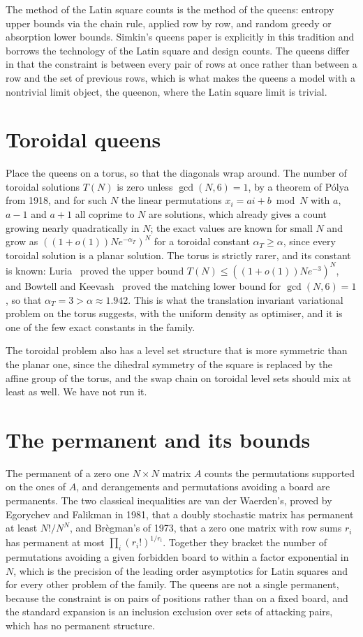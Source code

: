 The method of the Latin square counts is the method of the queens: entropy upper bounds via the chain rule, applied row by row, and random greedy or absorption lower bounds. Simkin's queens paper is explicitly in this tradition and borrows the technology of the Latin square and design counts. The queens differ in that the constraint is between every pair of rows at once rather than between a row and the set of previous rows, which is what makes the queens a model with a nontrivial limit object, the queenon, where the Latin square limit is trivial.

\section{Toroidal queens}

Place the queens on a torus, so that the diagonals wrap around. The number of toroidal solutions $T(N)$ is zero unless $\gcd(N, 6) = 1$, by a theorem of P\'olya from 1918, and for such $N$ the linear permutations $x_i = a i + b \bmod N$ with $a$, $a - 1$ and $a + 1$ all coprime to $N$ are solutions, which already gives a count growing nearly quadratically in $N$; the exact values are known for small $N$ and grow as $((1 + o(1)) N e^{-\alpha_T})^N$ for a toroidal constant $\alpha_T \ge \alpha$, since every toroidal solution is a planar solution. The torus is strictly rarer, and its constant is known: Luria~\cite{Luria2017} proved the upper bound $T(N) \le ((1 + o(1)) N e^{-3})^N$, and Bowtell and Keevash~\cite{BowtellKeevash} proved the matching lower bound for $\gcd(N, 6) = 1$, so that $\alpha_T = 3 > \alpha \approx 1.942$. This is what the translation invariant variational problem on the torus suggests, with the uniform density as optimiser, and it is one of the few exact constants in the family.

The toroidal problem also has a level set structure that is more symmetric than the planar one, since the dihedral symmetry of the square is replaced by the affine group of the torus, and the swap chain on toroidal level sets should mix at least as well. We have not run it.

\section{The permanent and its bounds}

The permanent of a zero one $N \times N$ matrix $A$ counts the permutations supported on the ones of $A$, and derangements and permutations avoiding a board are permanents. The two classical inequalities are van der Waerden's, proved by Egorychev and Falikman in 1981, that a doubly stochastic matrix has permanent at least $N! / N^N$, and Br\`egman's of 1973, that a zero one matrix with row sums $r_i$ has permanent at most $\prod_i (r_i!)^{1/r_i}$. Together they bracket the number of permutations avoiding a given forbidden board to within a factor exponential in $N$, which is the precision of the leading order asymptotics for Latin squares and for every other problem of the family. The queens are not a single permanent, because the constraint is on pairs of positions rather than on a fixed board, and the standard expansion is an inclusion exclusion over sets of attacking pairs, which has no permanent structure.

